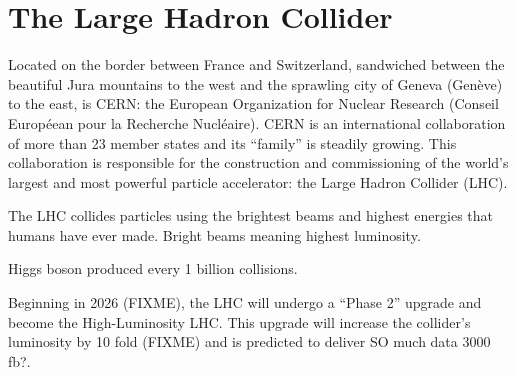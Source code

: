 \chapter{The Large Hadron Collider}
\label{ch:lhc}

Located on the border between France and Switzerland, sandwiched between the beautiful Jura mountains to the west and the sprawling city of Geneva (Genève) to the east, is CERN:
the European Organization for Nuclear Research 
(Conseil Européean pour la Recherche Nucléaire).
CERN is an international collaboration of more than 23 member states and its ``family'' is steadily growing.
This collaboration is responsible for the construction and commissioning of the world's largest and most powerful particle accelerator:
the Large Hadron Collider (LHC).

The LHC collides particles using the brightest beams and highest energies that humans have ever made.
Bright beams meaning highest luminosity.

Higgs boson produced every 1 billion collisions.

Beginning in 2026 (FIXME), the LHC will undergo a ``Phase 2'' upgrade and become the High-Luminosity LHC.
This upgrade will increase the collider's luminosity by 10 fold (FIXME) and is predicted to deliver SO much data 3000 fb?.
